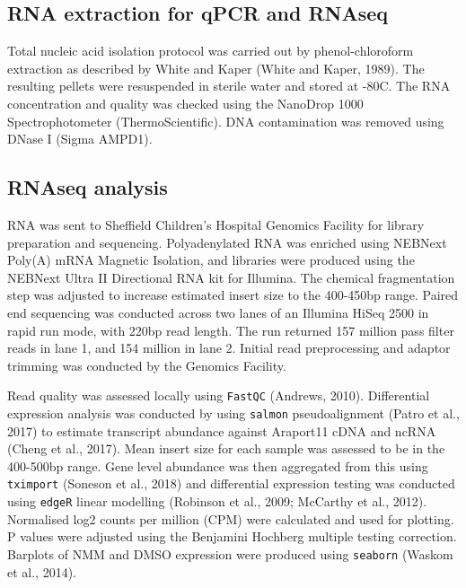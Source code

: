 \documentclass[12pt,a4paper,]{report}
\begin{document}
\hypertarget{rna-extraction-for-qpcr-and-rnaseq}{%
\subsection{RNA extraction for qPCR and
RNAseq}\label{rna-extraction-for-qpcr-and-rnaseq}}

Total nucleic acid isolation protocol was carried out by
phenol-chloroform extraction as described by White and Kaper (White and
Kaper, 1989). The resulting pellets were resuspended in sterile water
and stored at -80C. The RNA concentration and quality was checked using
the NanoDrop 1000 Spectrophotometer (ThermoScientific). DNA
contamination was removed using DNase I (Sigma AMPD1).

\hypertarget{rnaseq-analysis}{%
\subsection{RNAseq analysis}\label{rnaseq-analysis}}

RNA was sent to Sheffield Children's Hospital Genomics Facility for
library preparation and sequencing. Polyadenylated RNA was enriched
using NEBNext Poly(A) mRNA Magnetic Isolation, and libraries were
produced using the NEBNext Ultra II Directional RNA kit for Illumina.
The chemical fragmentation step was adjusted to increase estimated
insert size to the 400-450bp range. Paired end sequencing was conducted
across two lanes of an Illumina HiSeq 2500 in rapid run mode, with 220bp
read length. The run returned 157 million pass filter reads in lane 1,
and 154 million in lane 2. Initial read preprocessing and adaptor
trimming was conducted by the Genomics Facility.

Read quality was assessed locally using \texttt{FastQC} (Andrews, 2010).
Differential expression analysis was conducted by using \texttt{salmon}
pseudoalignment (Patro et al., 2017) to estimate transcript abundance
against Araport11 cDNA and ncRNA (Cheng et al., 2017). Mean insert size
for each sample was assessed to be in the 400-500bp range. Gene level
abundance was then aggregated from this using \texttt{tximport} (Soneson
et al., 2018) and differential expression testing was conducted using
\texttt{edgeR} linear modelling (Robinson et al., 2009; McCarthy et al.,
2012). Normalised log2 counts per million (CPM) were calculated and used
for plotting. P values were adjusted using the Benjamini Hochberg
multiple testing correction. Barplots of NMM and DMSO expression were
produced using \texttt{seaborn} (Waskom et al., 2014).
\end{document}
